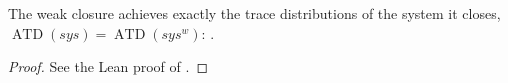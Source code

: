 \begin{theorem}
  \label{thm:weakclosure-eq}
  \leanok
  The weak closure achieves exactly the trace distributions of the system it closes, $\operatorname{ATD}(sys) = \operatorname{ATD}(sys^w)$: .
\end{theorem}

\begin{proof}\leanok
  See the Lean proof of .
\end{proof}
